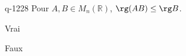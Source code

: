 \begin{truefalse}{q-1228}
Pour $A,B\in M_n(\mathbb{R})$, $\rg(AB)\leq \rg B$.
\item* Vrai
\item Faux
\end{truefalse}

